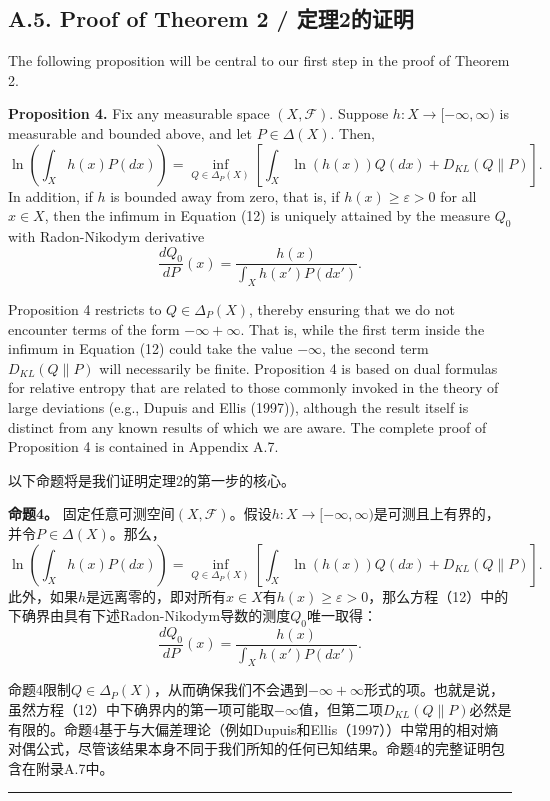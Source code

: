 \documentclass[12pt,a4paper]{article}
\newenvironment{original}
  {\par\noindent\color{black}\smallskip}
  {\par\smallskip}
\newenvironment{translation}
  {\par\noindent\color{blue!70!black}\smallskip}
  {\par\medskip\hrule\medskip}
\begin{document}
\subsection*{A.5. Proof of Theorem 2 / 定理2的证明}

\begin{original}
The following proposition will be central to our first step in the proof of Theorem 2.

\textbf{Proposition 4.} Fix any measurable space $(X, \mathcal{F})$. Suppose $h: X \to [-\infty, \infty)$ is measurable and bounded above, and let $P \in \Delta(X)$. Then,
\[
\ln\left( \int_X h(x) P(dx) \right) = \inf_{Q \in \Delta_P(X)} \left[ \int_X \ln(h(x)) Q(dx) + D_{KL}(Q\|P) \right].
\]
In addition, if $h$ is bounded away from zero, that is, if $h(x) \geq \varepsilon > 0$ for all $x \in X$, then the infimum in Equation (12) is uniquely attained by the measure $Q_0$ with Radon-Nikodym derivative
\[
\frac{dQ_0}{dP}(x) = \frac{h(x)}{\int_X h(x') P(dx')}.
\]

Proposition 4 restricts to $Q \in \Delta_P(X)$, thereby ensuring that we do not encounter terms of the form $-\infty + \infty$. That is, while the first term inside the infimum in Equation (12) could take the value $-\infty$, the second term $D_{KL}(Q\|P)$ will necessarily be finite. Proposition 4 is based on dual formulas for relative entropy that are related to those commonly invoked in the theory of large deviations (e.g., Dupuis and Ellis (1997)), although the result itself is distinct from any known results of which we are aware. The complete proof of Proposition 4 is contained in Appendix A.7.
\end{original}
\begin{translation}
以下命题将是我们证明定理2的第一步的核心。

\textbf{命题4。} 固定任意可测空间$(X, \mathcal{F})$。假设$h: X \to [-\infty, \infty)$是可测且上有界的，并令$P \in \Delta(X)$。那么，
\[
\ln\left( \int_X h(x) P(dx) \right) = \inf_{Q \in \Delta_P(X)} \left[ \int_X \ln(h(x)) Q(dx) + D_{KL}(Q\|P) \right].
\]
此外，如果$h$是远离零的，即对所有$x \in X$有$h(x) \geq \varepsilon > 0$，那么方程（12）中的下确界由具有下述Radon-Nikodym导数的测度$Q_0$唯一取得：
\[
\frac{dQ_0}{dP}(x) = \frac{h(x)}{\int_X h(x') P(dx')}.
\]

命题4限制$Q \in \Delta_P(X)$，从而确保我们不会遇到$-\infty + \infty$形式的项。也就是说，虽然方程（12）中下确界内的第一项可能取$-\infty$值，但第二项$D_{KL}(Q\|P)$必然是有限的。命题4基于与大偏差理论（例如Dupuis和Ellis（1997））中常用的相对熵对偶公式，尽管该结果本身不同于我们所知的任何已知结果。命题4的完整证明包含在附录A.7中。
\end{translation}
\end{document}
